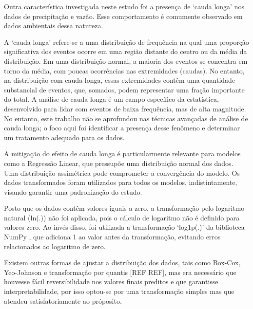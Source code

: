 Outra característica investigada neste estudo foi a presença de `cauda longa' nos dados de precipitação e vazão. Esse comportamento é comumente observado em dados ambientais dessa natureza.\cite{elena_macdonald_2023}

A `cauda longa' refere-se a uma distribuição de frequência na qual uma proporção significativa dos eventos ocorre em uma região distante do centro ou da média da distribuição. Em uma distribuição normal, a maioria dos eventos se concentra em torno da média, com poucas ocorrências nas extremidades (caudas). No entanto, na distribuição com cauda longa, essas extremidades contêm uma quantidade substancial de eventos, que, somados, podem representar uma fração importante do total. A análise de cauda longa é um campo específico da estatística, desenvolvido para lidar com eventos de baixa frequência, mas de alta magnitude. No entanto, este trabalho não se aprofundou nas técnicas avançadas de análise de cauda longa; o foco aqui foi identificar a presença desse fenômeno e determinar um tratamento adequado para os dados.

A mitigação do efeito de cauda longa é particularmente relevante para modelos como a Regressão Linear, que pressupõe uma distribuição normal dos dados. Uma distribuição assimétrica pode comprometer a convergência do modelo. Os dados transformados foram utilizados para todos os modelos, indistintamente, visando garantir uma padronização do estudo.


Posto que os dados contêm valores iguais a zero, a transformação pelo logaritmo natural (ln(.)) não foi aplicada, pois o cálculo de logaritmo não é definido para valores zero. Ao invés disso, foi utilizada a transformação `log1p(.)' da biblioteca NumPy \cite{numpyref}, que adiciona 1 ao valor antes da transformação, evitando erros relacionados ao logaritmo de zero.

Existem outras formas de ajustar a distribuição dos dados, tais como Box-Cox, Yeo-Johnson e transformação por quantis [REF REF], mas era necessário que houvesse fácil reversibilidade nos valores finais preditos e que garantisse interpretabilidade, por isso optou-se por uma transformação simples mas que atendeu satisfatoriamente ao próposito.

